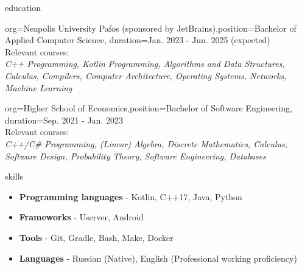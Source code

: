 \documentclass{resume}
\begin{document}
\makeheader

\begin{ResumeSection}{education}
    \begin{ResumeSubsection}{org={Neapolis University Pafos (sponsored by JetBrains)},position={Bachelor of Applied Computer Science}, duration={Jan. 2023 - Jun. 2025 (expected)}} \\
    Relevant courses: \\
	\textit{C++ Programming, Kotlin Programming, Algorithms and Data Structures, Calculus, Compilers, Computer Architecture, Operating Systems, Networks, Machine Learning}  
    \end{ResumeSubsection}
	\begin{ResumeSubsection}{org={Higher School of Economics},position={Bachelor of Software Engineering}, duration={Sep. 2021 - Jan. 2023}} \\
    Relevant courses: \\
		\textit{C++/C\# Programming, (Linear) Algebra, Discrete Mathematics, Calculus, Software Design, Probability Theory, Software Engineering, Databases}
    \end{ResumeSubsection}
\end{ResumeSection}

\begin{ResumeSection}{skills}
    \newcommand{\skill}[2]{\textbf{#1} - #2}
        \begin{itemize}
            \item \skill{Programming languages}{Kotlin, C++17, Java, Python}
			\item \skill{Frameworks}{Userver, Android}
            \item \skill{Tools}{Git, Gradle, Bash, Make, Docker}
            \item \skill{Languages}{Russian (Native), English (Professional working proficiency)}
        \end{itemize}
\end{ResumeSection}
\end{document}
